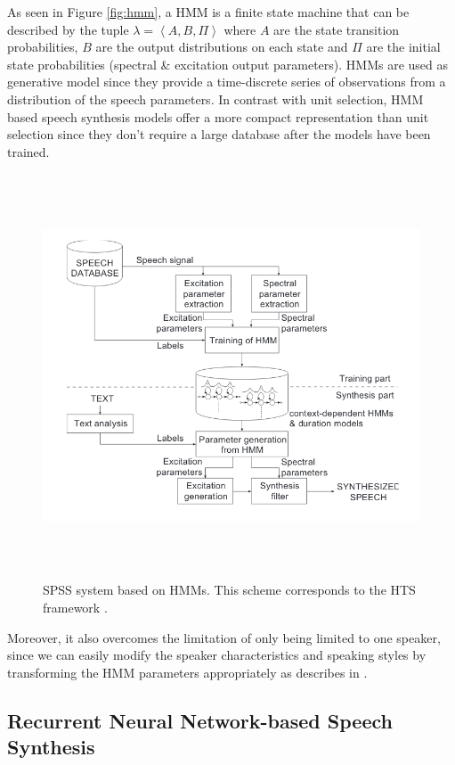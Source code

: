 As seen in Figure \ref{fig:hmm}, a HMM is a finite state machine that can be described by the tuple $\lambda = \left < A, B, \Pi \right >$ where $A$ are the state transition probabilities, $B$ are the output distributions on each state and $\Pi$ are the initial state probabilities (spectral \& excitation output parameters). HMMs are used as generative model since they provide a time-discrete series of observations from a distribution of the speech parameters. In contrast with unit selection, HMM based speech synthesis models offer a more compact representation than unit selection since they don't require a large database after the models have been trained.

\begin{figure}
    \centering
    \includegraphics[height=12cm]{figures/hts}
    \caption{SPSS system based on HMMs. This scheme corresponds to the HTS framework \cite{zen2007hmm}.}
    \label{fig:hts}
\end{figure}

Moreover, it also overcomes the limitation of only being limited to one speaker, since we can easily modify the speaker characteristics and speaking styles by transforming the HMM parameters appropriately as describes in \cite{zen2007hmm}. 


\subsection{Recurrent Neural Network-based Speech Synthesis} \label{sec:rnn-tts}

